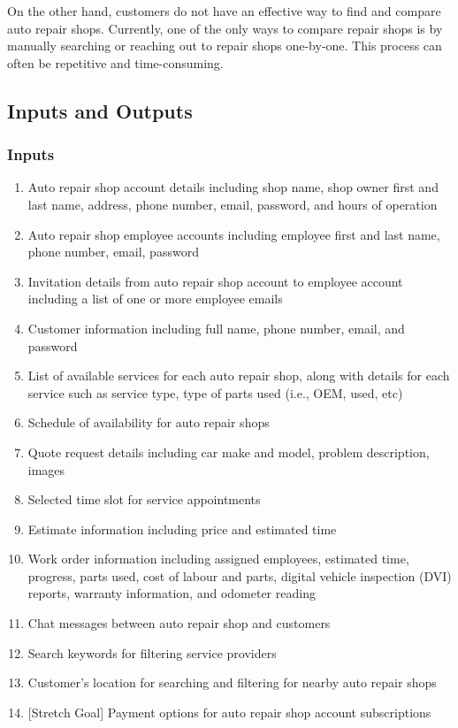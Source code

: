 \documentclass{article}
\begin{document}
On the other hand, customers do not have an effective way to find and compare auto repair shops. 
Currently, one of the only ways to compare repair shops is by manually searching or reaching out to repair shops one-by-one. 
This process can often be repetitive and time-consuming.

\subsection{Inputs and Outputs}
\subsubsection{Inputs}
\begin{enumerate}
    \item Auto repair shop account details including shop name, shop owner first and last name, address, phone number, email, 
    password, and hours of operation
    \item Auto repair shop employee accounts including employee first and last name, phone number, email, password
    \item Invitation details from auto repair shop account to employee account including a list of one or more employee emails
    \item Customer information including full name, phone number, email, and password
    \item List of available services for each auto repair shop, along with details for each service such as service type, 
    type of parts used {(i.e., OEM, used, etc)}
    \item Schedule of availability for auto repair shops
    \item Quote request details including car make and model, problem description, images
    \item Selected time slot for service appointments
    \item Estimate information including price and estimated time
    \item Work order information including assigned employees, estimated time, progress, parts used, cost of labour and parts, 
    digital vehicle inspection {(DVI)} reports, warranty information, and odometer reading
    \item Chat messages between auto repair shop and customers
    \item Search keywords for filtering service providers
    \item Customer's location for searching and filtering for nearby auto repair shops
    \item {[Stretch Goal]} Payment options for auto repair shop account subscriptions
\end{enumerate}
\end{document}
